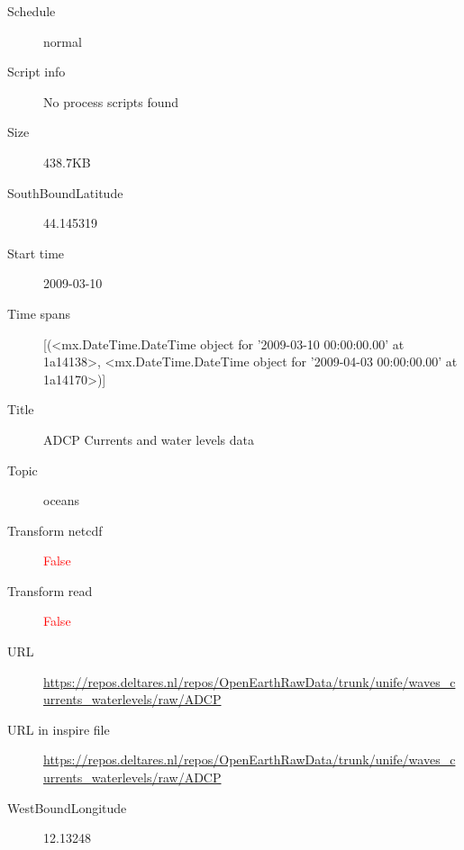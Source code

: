 \documentclass[9]{report}
\begin{document}
\begin{description}
\begin{verbatim}
\end{verbatim}
  \item[Schedule] normal
  \item[Script info] No process scripts found
  \item[Size] 438.7KB
  \item[SouthBoundLatitude] 44.145319
  \item[Start time] 2009-03-10
  \item[Time spans] [(<mx.DateTime.DateTime object for '2009-03-10 00:00:00.00' at 1a14138>, <mx.DateTime.DateTime object for '2009-04-03 00:00:00.00' at 1a14170>)]
  \item[Title]  ADCP Currents and water levels data 
  \item[Topic] oceans
  \item[Transform netcdf] \textcolor{red}{False}
  \item[Transform read] \textcolor{red}{False}
  \item[URL] \href{https://repos.deltares.nl/repos/OpenEarthRawData/trunk/unife/waves\_currents\_waterlevels/raw/ADCP}{https://repos.deltares.nl/repos/OpenEarthRawData/trunk/unife/waves\_currents\_waterlevels/raw/ADCP}
  \item[URL in inspire file] \href{https://repos.deltares.nl/repos/OpenEarthRawData/trunk/unife/waves\_currents\_waterlevels/raw/ADCP}{https://repos.deltares.nl/repos/OpenEarthRawData/trunk/unife/waves\_currents\_waterlevels/raw/ADCP}
  \item[WestBoundLongitude] 12.13248
\end{description}
\end{document}

